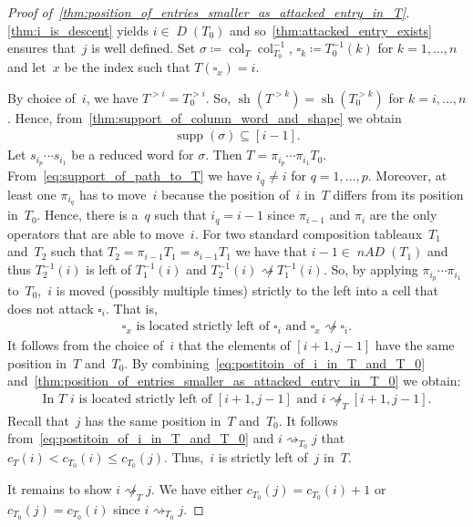 \documentclass[10pt]{amsart}
\theoremstyle{plain}
\theoremstyle{plain}
\theoremstyle{plain}
\theoremstyle{plain}
\theoremstyle{plain}
\theoremstyle{definition}
\theoremstyle{definition}
\newcommand{\D}{\operatorname{\mathit{D}}}
\newcommand{\nAD}{\operatorname{\mathit{nAD}}}
\DeclareMathOperator{\sh}{sh}
\DeclareMathOperator{\supp}{supp}
\newcommand{\fs}{s}
\newcommand{\col}{\operatorname{col}}
\newcommand{\att}{\rightsquigarrow}
\newcommand{\cell}{\square}
\begin{document}
\begin{proof}[Proof of~\cref{thm:position_of_entries_smaller_as_attacked_entry_in_T}] 
	\cref{thm:i_is_descent} yields $i\in \D(T_0)$ and so~\cref{thm:attacked_entry_exists} ensures that~$j$ is well defined. Set $\sigma \coloneqq \col_T\col^{-1}_{T_0}$, $\cell_k \coloneqq T_0^{-1}(k)$ for $k=1,\dots, n$ and let~$x$ be the index such that $T(\cell_x)= i$. 

	 By choice of~$i$, we have $T^{>i} = T_0^{>i}$. So, $\sh (T^{>k}) = \sh (T_0^{>k})$ for $k = i ,\dots, n$. Hence, from~\cref{thm:support_of_column_word_and_shape} we obtain 
		\begin{align}
		\label{eq:support_of_path_to_T}
			\supp(\sigma) \subseteq [i-1].	
		\end{align}
	Let $\fs_{i_p} \cdots \fs_{i_1}$ be a reduced word for $\sigma$.
	Then $T = \pi_{i_p} \cdots \pi_{i_1} T_0$. From~\eqref{eq:support_of_path_to_T} we have $i_q \neq i$ for $q=1,\dots, p$.
	Moreover, at least one $\pi_{i_q}$ has to move~$i$ because the position of~$i$ in~$T$ differs from its position in~$T_0$. Hence, there is a~$q$ such that $i_q = i-1$ since $\pi_{i-1}$ and $\pi_i$ are the only operators that are able to move~$i$.
	For two standard composition tableaux~$T_1$ and~$T_2$ such that $T_2 = \pi_{i-1}T_1= \fs_{i-1} T_1$ we have that $i-1\in \nAD (T_1)$ and thus $T_2^{-1}(i)$ is left of $T_1^{-1}(i)$ and $T_2^{-1}(i) \not \att T_1^{-1}(i)$. So, by applying $\pi_{i_p} \cdots \pi_{i_1}$ to~$T_0$,~$i$ is moved (possibly multiple times) strictly to the left into a cell that does not attack $\cell_i$. That is,
	\begin{align}
		\label{eq:postitoin_of_i_in_T_and_T_0}
		\text{$\cell_x$ is located strictly left of $\cell_i$ and $\cell_x\not \att \cell_i$.}
	\end{align}
	It follows from the choice of~$i$ that the elements of $[i+1,j-1]$ have the same position in~$T$ and~$T_0$. By combining~\eqref{eq:postitoin_of_i_in_T_and_T_0} and~\cref{thm:position_of_entries_smaller_as_attacked_entry_in_T_0} we obtain:
	\begin{align}
	\text{In~$T$~$i$ is located strictly left of $[i+1,j-1]$ and $i\not \att_T [i+1,j-1]$.}
	\end{align}
	Recall that~$j$ has the same position in~$T$ and~$T_0$. 
	It follows from~\eqref{eq:postitoin_of_i_in_T_and_T_0} and $i\att_{T_0} j$ that $c_T(i) < c_{T_0}(i)\leq c_{T_0}(j)$. Thus,~$i$ is strictly left of~$j$ in~$T$.
	
	It remains to show $i\not \att_T j$.
	 We have either $c_{T_0}(j)=c_{T_0}(i)+1$ or $c_{T_0}(j)=c_{T_0}(i)$ since $i\att_{T_0} j$.
	

\end{proof}
\end{document}
